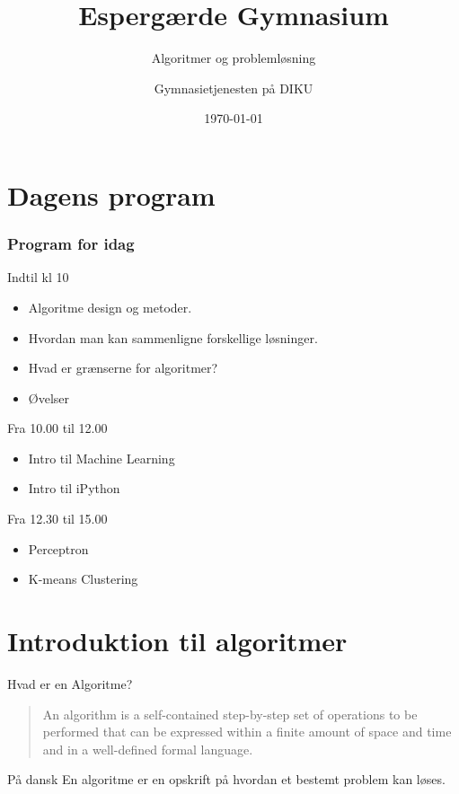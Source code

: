 \documentclass[12pt,t]{beamer}
\title{Espergærde Gymnasium}
\subtitle{Algoritmer og problemløsning}
\author{
        Gymnasietjenesten på DIKU
}
\date[]{\today}
\begin{document}
\frame[plain]{\titlepage}

\section{Dagens program}

\begin{frame}
    \frametitle{Program for idag}
    \begin{block}{Indtil kl 10}
        \begin{itemize}
            \item Algoritme design og metoder. \pause
            \item Hvordan man kan sammenligne forskellige løsninger. \pause
            \item Hvad er grænserne for algoritmer? \pause
            \item Øvelser
        \end{itemize}
    \end{block}
    \pause
    \begin{block}{Fra 10.00 til 12.00}
        \begin{itemize}
            \item Intro til Machine Learning \pause
            \item Intro til iPython \pause
        \end{itemize}
    \end{block}
    \pause
    \begin{block}{Fra 12.30 til 15.00}
        \begin{itemize}
            \item Perceptron \pause
            \item K-means Clustering
        \end{itemize}
    \end{block}
\end{frame}


\section{Introduktion til algoritmer}
    \begin{frame}[c]{Hvad er en Algoritme?}
        \begin{quote}
            An algorithm is a self-contained step-by-step set of operations to
            be performed that can be expressed within a finite amount of space
            and time and in a well-defined formal language.
        \end{quote}
        \pause
        \begin{block}{På dansk}
            En algoritme er en \alert{opskrift} på hvordan et bestemt problem
            kan løses.
        \end{block}
    \end{frame}
\end{document}
